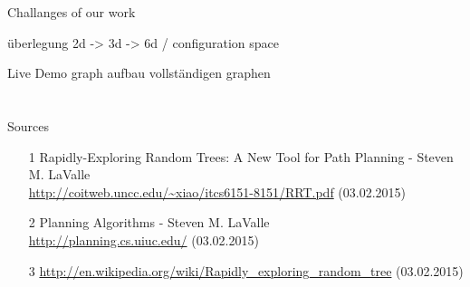 \documentclass[%
  professionalfonts,%
  xcolor={%
    usenames,%
    dvipsnames,%
    svgnames,%
    table,%
    hyperref%
  }%
]{beamer}
\begin{document}
        \begin{frame}{Challanges of our work}
          
          überlegung 2d -> 3d -> 6d / configuration space
        \end{frame}
        
        
        \begin{frame}{Live Demo}
          graph aufbau 
          vollständigen graphen
        \end{frame}
          
  \section{}
    \begin{frame}{Sources}
      \begin{itemize}
        \item[1] Rapidly-Exploring Random Trees: A New Tool for Path Planning - Steven M. LaValle 
        \\\url{http://coitweb.uncc.edu/~xiao/itcs6151-8151/RRT.pdf} (03.02.2015)
        \item[2] Planning Algorithms - Steven M. LaValle \\\url{http://planning.cs.uiuc.edu/} (03.02.2015)
        \item[3] \url{http://en.wikipedia.org/wiki/Rapidly_exploring_random_tree} (03.02.2015)
    \end{itemize}
  \end{frame}
  
  \begin{frame}
    \Huge{}
  \end{frame}
\end{document}

